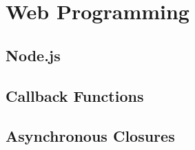 









\section{Web Programming}


\subsection{Node.js}


\subsection{Callback Functions}

\subsection{Asynchronous Closures}

%

